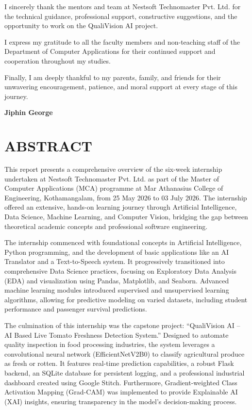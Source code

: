 I sincerely thank the mentors and team at Nestsoft Technomaster Pvt. Ltd. for the technical guidance, professional support, constructive suggestions, and the opportunity to work on the QualiVision AI project.

I express my gratitude to all the faculty members and non-teaching staff of the Department of Computer Applications for their continued support and cooperation throughout my studies.

Finally, I am deeply thankful to my parents, family, and friends for their unwavering encouragement, patience, and moral support at every stage of this journey.

\vspace{1cm}
\begin{flushright}
\textbf{Jiphin George}
\end{flushright}

\newpage

\chapter*{ABSTRACT}

This report presents a comprehensive overview of the six-week internship undertaken at Nestsoft Technomaster Pvt. Ltd. as part of the Master of Computer Applications (MCA) programme at Mar Athanasius College of Engineering, Kothamangalam, from 25 May 2026 to 03 July 2026. The internship offered an extensive, hands-on learning journey through Artificial Intelligence, Data Science, Machine Learning, and Computer Vision, bridging the gap between theoretical academic concepts and professional software engineering.

The internship commenced with foundational concepts in Artificial Intelligence, Python programming, and the development of basic applications like an AI Translator and a Text-to-Speech system. It progressively transitioned into comprehensive Data Science practices, focusing on Exploratory Data Analysis (EDA) and visualization using Pandas, Matplotlib, and Seaborn. Advanced machine learning modules introduced supervised and unsupervised learning algorithms, allowing for predictive modeling on varied datasets, including student performance and passenger survival predictions.

The culmination of this internship was the capstone project: ``QualiVision AI – AI Based Live Tomato Freshness Detection System.'' Designed to automate quality inspection in food processing industries, the system leverages a convolutional neural network (EfficientNetV2B0) to classify agricultural produce as fresh or rotten. It features real-time prediction capabilities, a robust Flask backend, an SQLite database for persistent logging, and a professional industrial dashboard created using Google Stitch. Furthermore, Gradient-weighted Class Activation Mapping (Grad-CAM) was implemented to provide Explainable AI (XAI) insights, ensuring transparency in the model's decision-making process.

